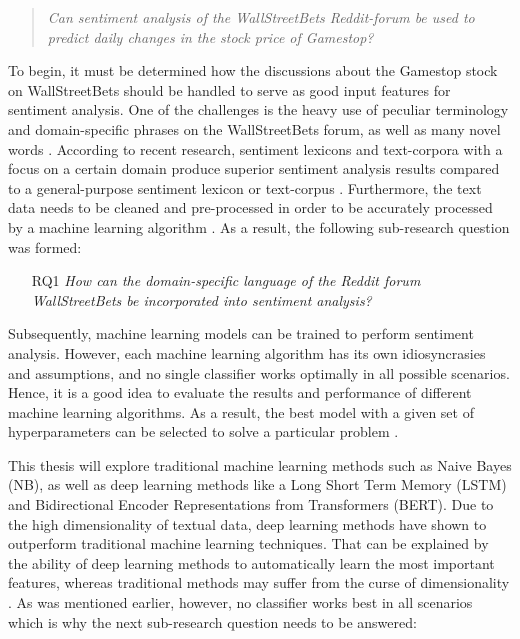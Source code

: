\documentclass[11pt, a4paper]{article}
\begin{document}
\begin{quote}
\emph{Can sentiment analysis of the WallStreetBets Reddit-forum be used to predict daily changes in the stock price of Gamestop?}
\end{quote}

To begin, it must be determined how the discussions about the Gamestop stock on WallStreetBets should be handled to serve as good input features for sentiment analysis. 
One of the challenges is the heavy use of peculiar terminology and domain-specific phrases on the WallStreetBets forum, as well as many novel words \citep{anand2021WallstreetbetsAgainstWallstreet}. 
According to recent research, sentiment lexicons and text-corpora with a focus on a certain domain produce superior sentiment analysis results compared to a 
general-purpose sentiment lexicon or text-corpus \citep{park2015EfficientExtraction}. Furthermore, the text data needs to be cleaned and pre-processed in order to be accurately 
processed by a machine learning algorithm \citep{jemai2021SentimentAnalysis}. As a result, the following sub-research question was formed:

\begin{itemize}
    \item[RQ1] \emph{How can the domain-specific language of the Reddit forum WallStreetBets be incorporated into sentiment analysis?}
\end{itemize}

Subsequently, machine learning models can be trained to perform sentiment analysis. However, 
each machine learning algorithm has its own idiosyncrasies and assumptions, and no single classifier 
works optimally in all possible scenarios. Hence, it is a good idea to evaluate the results and 
performance of different machine learning algorithms. As a result, the best model with a given set 
of hyperparameters can be selected to solve a particular problem \citep[p. 53]{raschka2019pythonmachinelearning}. 

This thesis will explore traditional machine learning methods such as Naive Bayes (NB), as well as deep learning methods like a
Long Short Term Memory (LSTM) and Bidirectional Encoder Representations from 
Transformers (BERT).
Due to the high dimensionality of textual data, deep learning methods have shown 
to outperform traditional machine learning techniques. That can be explained by the 
ability of deep learning methods to automatically learn the most important features, whereas traditional 
methods may suffer from the curse of dimensionality \citep{fu2018lexiconenhancedlstm}.
As was mentioned earlier, however, no classifier works best in all scenarios which is why the next sub-research question needs to be answered:
\end{document}
